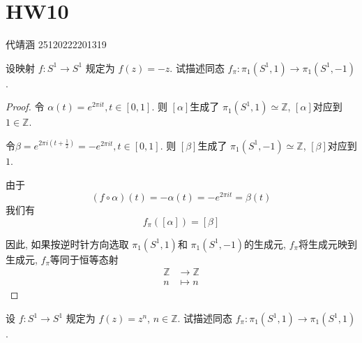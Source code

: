 \documentclass[../main.tex]{subfiles}
\begin{document}
\ifSubfilesClassLoaded{

    
    \setcounter{chapter}{9}
}{}

\chapter{ HW10 }
 代靖涵 25120222201319

\begin{exercise}{}{}
设映射 $f\colon S^{1}\to S^{1}$ 规定为 $f(z)=-z$. 试描述同态 $f_{\pi}\colon \pi_{1}(S^{1},1)\to \pi_{1}(S^{1},-1)$.
\end{exercise}

\begin{proof}
    令 \(  \alpha \left( t \right)= e^{2 \pi it}, t\in \left[ 0,1 \right]    \). 则 \(  [\alpha ]  \)生成了 \(   \pi _1 \left( S^{1},1 \right)\simeq \mathbb{Z}    \), \(  [\alpha ]  \)对应到 \(  1\in \mathbb{Z}   \).     

    令\(  \beta = e^{2 \pi i\left( t+ \frac{1 }{2 }  \right) }= -e^{2 \pi it}, t\in \left[ 0,1 \right]   \). 则 \(  [\beta ]  \)生成了 \(   \pi _1 \left( S^{1},-1 \right)   \simeq \mathbb{Z} \), \(  [\beta ]  \)对应到 \(  1  \).     

    由于 \[
    \left( f\circ \alpha  \right)\left( t \right)= -\alpha \left( t \right)= -e^{2 \pi it}= \beta \left( t \right)    
    \]我们有 \[
    f_{ \pi }\left( [\alpha ] \right)= [\beta ] 
    \]

    因此, 如果按逆时针方向选取 \(   \pi _1 \left( S^{1},1 \right)   \)和 \(   \pi _1 \left( S^{1},-1 \right)   \)的生成元, \(  f_{ \pi }  \)将生成元映到生成元, \(  f_{ \pi }  \)等同于恒等态射 \[
    \begin{aligned}
    \mathbb{Z} &\to \mathbb{Z} \\ 
     n&\mapsto n 
    \end{aligned}
    \]  
\end{proof}

\begin{exercise}{}{}
设 \(f\colon S^{1}\to S^{1}\) 规定为 \(f(z)=z^{n}\), \(n\in \mathbb{Z}\). 试描述同态 \(f_{\pi}\colon \pi_{1}(S^{1},1)\to \pi_{1}(S^{1},1)\).
\end{exercise}
\end{document}

